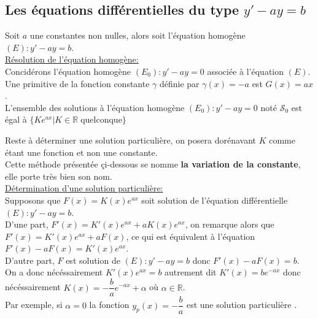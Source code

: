 \documentclass[french]{book}
\newcommand{\cals}{\mathscr{S}}
\begin{document}


\subsection{Les équations différentielles du type $y'-ay=b$ }

Soit $a$ une constantes non nulles, alors soit l'équation homogène $(E): y'-ay=b $. \\

\underline{Résolution de l'équation homogène:}\\

Concidérons l'équation homogène $(E_0): y'-ay=0 $ associée à l'équation $(E)$.\\

Une primitive de la fonction constante $\gamma$ définie par $\gamma(x)=-a$ est $G(x)=ax$. \\

L'ensemble des solutions à l'équation homogène $(E_0): y'-ay=0 $ noté $\cals_0$ est égal à $\{Ke^{ax} \vert  K\in \mathbb{R} \; \text{quelconque} \}$

Reste à déterminer une solution particulière, on posera dorénavant $K$ comme étant une fonction et non une constante.\\

Cette méthode présentée çi-dessous se nomme \textbf{la variation de la constante}, elle porte très bien son nom.\\

\underline{Détermination d'une solution particulière:}\\

Supposons que $F(x)=K(x)e^{ax}$ soit solution de l'équation différentielle $(E): y'-ay=b$. \\

D'une part, $F'(x)=K'(x)e^{ax}+aK(x)e^{ax}$, on remarque alors que $F'(x)=K'(x)e^{ax}+aF(x)$, ce qui est équivalent à l'équation $F'(x)-aF(x)=K'(x)e^{ax}$.\\

D'autre part, $F$ est solution de $(E): y'-ay=b$ donc $F'(x)-aF(x)=b$. \\

On a donc nécéssairement $K'(x)e^{ax}=b$  autrement dit $K'(x)=be^{-ax}$ donc  nécéssairement $K(x)=- \dfrac{b}{a}e^{-ax} + \alpha $ où $\alpha \in \mathbb{R}$. \\

Par exemple, si $\alpha=0$ la fonction $y_p(x)=-\dfrac{b}{a}$ est une solution particulière . \\
\end{document}

